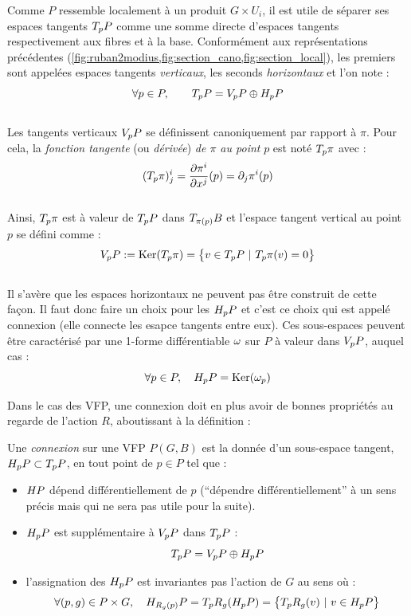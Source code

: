 Comme $P$ ressemble localement à un produit $G\times U_i$, il est utile de séparer ses espaces tangents $\tg[p]{P}$ comme une somme directe d'espaces tangents respectivement aux fibres et à la base. Conformément aux représentations précédentes (\cref{fig:ruban2modius,fig:section_cano,fig:section_local}), les premiers sont appelées espaces tangents \emph{verticaux}, les seconds \emph{horizontaux} et l'on note :
\[\forall p\in P,\qquad \tg[p]{P} = \vg[p]{P} \oplus \hg[p]{P}\]
\\
Les tangents verticaux $\vg[p]{P}$ se définissent canoniquement par rapport à $\pi$. Pour cela, la \emph{fonction tangente} (ou \emph{dérivée}) \emph{de $\pi$ au point} $p$ est noté $\tg[p]{\pi}$ avec :
\[(\tg[p]{\pi})^i_j = \frac{\partial \pi^i}{\partial x^j}(p) = \partial_j\pi^i(p)\]
\\
Ainsi, $\tg[p]{\pi}$ est à valeur de $\tg[p]{P}$ dans $\tg[\pi(p)]{B}$ et l'espace tangent vertical au point $p$ se défini comme :
\[\vg[p]{P} \defeq \Ker (\tg[p]{\pi}) = \big\{ v\in\tg[p]{P}\ |\ \tg[p]{\pi}(v)=0 \big\}\]
\\ 
Il s'avère que les espaces horizontaux ne peuvent pas être construit de cette façon. Il faut donc faire un choix pour les $\hg[p]{P}$ et c'est ce choix qui est appelé connexion (elle connecte les esapce tangents entre eux).
Ces sous-espaces peuvent être caractérisé par une 1-forme différentiable $\conn$ sur $P$ à valeur dans $\vg[p]{P}$, auquel cas :
\[\forall p\in P,\quad \hg[p]{P} = \Ker(\conn_p)\]
\skipl

Dans le cas des VFP, une connexion doit en plus avoir de bonnes propriétés au regarde de l'action $R$, aboutissant à la définition :
\begin{definition} \label{def:connexion2VFP}
	Une \emph{connexion} sur une VFP $P(G,B)$ est la donnée d'un sous-espace tangent, $\hg[p]{P}\subset \tg[p]{P}$, en tout point de $p\in P$ tel que :
	\begin{itemize}
		
		\item $\hg{P}$ dépend différentiellement de $p$ (``dépendre différentiellement'' à un sens précis mais qui ne sera pas utile pour la suite).
		
		\item $\hg[p]{P}$ est supplémentaire à $\vg[p]{P}$ dans $\tg[p]{P}$ :
		\begin{equation}\label{eq:TP=V+H}
			\tg[p]{P} = \vg[p]{P} \oplus \hg[p]{P}
		\end{equation}
		
		\item l'assignation des $\hg[p]{P}$ est invariantes pas l'action de $G$ au sens où :
		\begin{equation}\label{eq:conn_G-inv}
			\forall (p,g)\in P\times G,\quad \hg[R_g(p)]{P} = \tg[p]{R_g} (\hg[p]{P}) = \big\{\tg[p]{R_g}(v)\ |\ v \in \hg[p]{P} \big\}
		\end{equation}
	\end{itemize}
\end{definition}
\skipl

